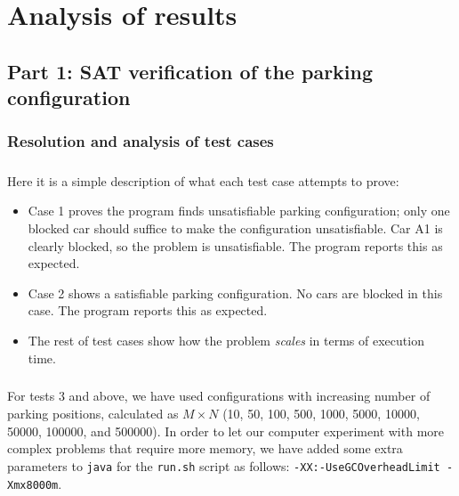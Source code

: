 \chapter{Analysis of results}
\label{chapter: analysis of results}









\section{Part 1: SAT verification of the parking configuration}

\subsection{Resolution and analysis of test cases}

\paragraph{}
Here it is a simple description of what each test case attempts to prove:
\begin{itemize}
  \item Case 1 proves the program finds unsatisfiable parking configuration; only one blocked car should suffice to make the configuration unsatisfiable. Car A1 is clearly blocked, so the problem is unsatisfiable. The program reports this as expected.
  \item Case 2 shows a satisfiable parking configuration. No cars are blocked in this case. The program reports this as expected.
  \item The rest of test cases show how the problem \textit{scales} in terms of execution time.
\end{itemize}

\paragraph{}
For tests 3 and above, we have used configurations with increasing number of parking positions, calculated as $M \times N$ (10, 50, 100, 500, 1000, 5000, 10000, 50000, 100000, and 500000). In order to let our computer experiment with more complex problems that require more memory, we have added some extra parameters to \texttt{java} for the \texttt{run.sh} script as follows: \texttt{-XX:-UseGCOverheadLimit -Xmx8000m}.

